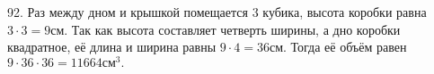 92. Раз между дном и крышкой помещается 3 кубика, высота коробки равна $3\cdot3=9$см. Так как высота составляет четверть ширины, а дно коробки квадратное, её длина и ширина равны $9\cdot4=36$см. Тогда её объём равен $9\cdot36\cdot36=11664\text{см}^3.$\\
